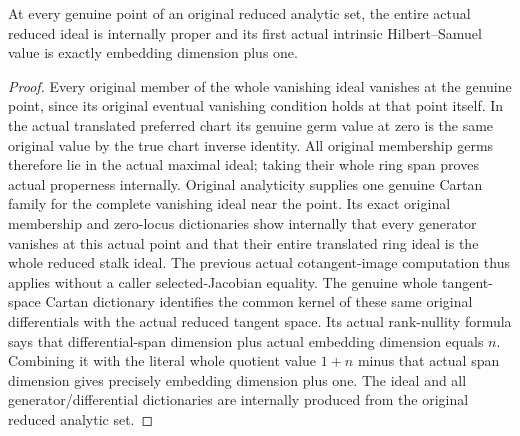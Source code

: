 \begin{theorem}
\label{hir:actual-reduced-hilbert-samuel-tangent-value}
\leanok
{}
At every genuine point of an original reduced analytic set, the entire
actual reduced ideal is internally proper and its first actual intrinsic
Hilbert--Samuel value is exactly embedding dimension plus one.
\end{theorem}
\begin{proof}
Every original member of the whole vanishing ideal vanishes at the genuine
point, since its original eventual vanishing condition holds at that point
itself. In the actual translated preferred chart its genuine germ value at
zero is the same original value by the true chart inverse identity. All
original membership germs therefore lie in the actual maximal ideal;
taking their whole ring span proves actual properness internally.
Original analyticity supplies one genuine Cartan family for the complete
vanishing ideal near the point. Its exact original membership and zero-locus
dictionaries show internally that every generator vanishes at this actual
point and that their entire translated ring ideal is the whole reduced
stalk ideal. The previous actual cotangent-image computation thus applies
without a caller selected-Jacobian equality. The genuine whole tangent-space
Cartan dictionary identifies the common kernel of these same original
differentials with the actual reduced tangent space. Its actual rank-nullity
formula says that differential-span dimension plus actual embedding
dimension equals $n$. Combining it with the literal whole quotient value
$1+n$ minus that actual span dimension gives precisely embedding dimension
plus one. The ideal and all generator/differential dictionaries are
internally produced from the original reduced analytic set.
\end{proof}

